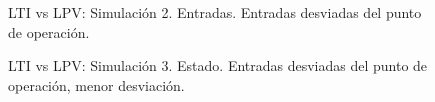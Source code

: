 \documentclass[a4paper, 10pt, onecolumn,journal]{ieeeconf}
\begin{document}
\begin{figure}[H]
	\centering
	\begin{adjustbox}{scale=0.7,max width=\columnwidth}
	\end{adjustbox}
	\caption{LTI vs LPV: Simulación 2. Entradas. Entradas desviadas del punto de operación.}
	\label{simulación 2 entradas}
\end{figure}


\begin{figure}[H]
	\centering
	\begin{adjustbox}{max width=\columnwidth}
	\end{adjustbox}
	\caption{LTI vs LPV: Simulación 3. Estado. Entradas desviadas del punto de operación, menor desviación.}
	\label{simulación 3 estado}
\end{figure}
\end{document}
